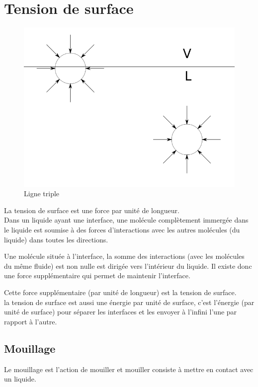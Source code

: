 \documentclass[french]{article}
\begin{document}
\section{Tension de surface}
\begin{figure}[ht]
	\centering
	\includegraphics[scale = 0.3]{./image/rondforces.png}
	\caption{Ligne triple}
\end{figure}

La tension de surface est une force par unité de longueur.\\ 

Dans un liquide ayant une interface, une molécule complètement immergée dans le liquide est soumise à des forces d'interactions avec les autres molécules (du liquide) dans toutes les directions. 

Une molécule située à l'interface, la somme des interactions (avec les molécules du même fluide) est non nulle est dirigée vers l'intérieur du liquide. Il existe donc une force supplémentaire qui permet de maintenir l'interface.

Cette force supplémentaire (par unité de longueur) est la tension de surface.\\



la tension de surface est aussi une énergie par unité de surface, c'est l'énergie (par unité de surface) pour séparer les interfaces et les envoyer à l'infini l'une par rapport à l'autre.


\subsection{Mouillage}
Le mouillage est l'action de mouiller et mouiller consiste à  mettre en contact avec un liquide.\\
\end{document}
